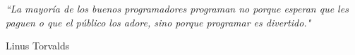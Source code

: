 \documentclass[11pt, oneside]{Thesis} %
\begin{document}


\clearpage %


\pagestyle{empty} %

\null\vfill %

\textit{``La mayoría de los buenos programadores programan no porque esperan que les paguen o que el público los adore, sino porque programar es divertido."}

\begin{flushright}
Linus Torvalds
\end{flushright}

\vfill\vfill\vfill\vfill\vfill\vfill\null %

\clearpage %


\end{document}
